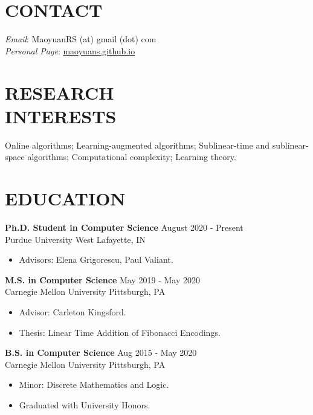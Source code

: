 \documentclass[margin, 10pt]{res} %
\begin{document}
\begin{resume}

\section{CONTACT}
\emph{Email}: MaoyuanRS (at) gmail (dot) com\\
\emph{Personal Page}: \href{https://maoyuans.github.io}{maoyuans.github.io}

 
\section{RESEARCH \\ INTERESTS}  

Online algorithms; Learning-augmented algorithms; Sublinear-time and sublinear-space algorithms; Computational complexity; Learning theory.

 
\section{EDUCATION}

{\bf Ph.D. Student in Computer Science} \hfill August 2020 - Present \\
Purdue University \hfill West Lafayette, IN

\begin{itemize}
\item Advisors: Elena Grigorescu, Paul Valiant.
\end{itemize} 

{\bf M.S. in Computer Science} \hfill May 2019 - May 2020 \\
Carnegie Mellon University \hfill Pittsburgh, PA

\begin{itemize}
\item Advisor: Carleton Kingsford. \hspace{-2em}
\item Thesis: Linear Time Addition of Fibonacci Encodings.
\end{itemize} 

{\bf B.S. in Computer Science} \hfill Aug 2015 - May 2020 \\
Carnegie Mellon University \hfill Pittsburgh, PA

\begin{itemize}
\item Minor: Discrete Mathematics and Logic.
\item Graduated with University Honors.
\end{itemize} 



\end{resume}
\end{document}
